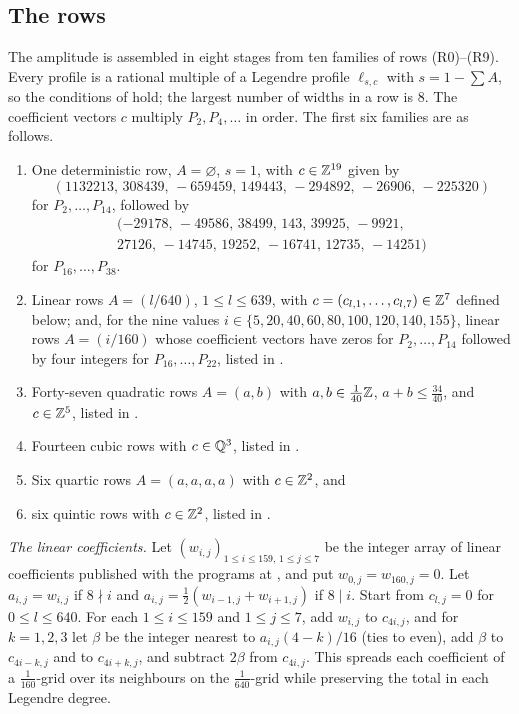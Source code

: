 \documentclass[11pt,colorlinks]{charlie}
\begin{document}
\subsection{The rows}
The amplitude is assembled in eight stages from ten families of rows (R0)--(R9). Every profile is a rational multiple of a Legendre profile $\ell_{s,c}$ with $s=1-\sum A$, so the conditions of  hold; the largest number of widths in a row is $8$. The coefficient vectors $c$ multiply $P_2,P_4,\dots$ in order. The first six families are as follows.
\begin{enumerate}
\item[(R0)] One deterministic row, $A=\varnothing$, $s=1$, with $c\in\mathbb{Z}^{19}$ given by
\[
 (1132213,\,308439,\,-659459,\,149443,\,-294892,\,-26906,\,-225320)
\]
for $P_2,\dots,P_{14}$, followed by
\begin{gather*}
 (-29178,\,-49586,\,38499,\,143,\,39925,\,-9921,\\
 27126,\,-14745,\,19252,\,-16741,\,12735,\,-14251)
\end{gather*}
for $P_{16},\dots,P_{38}$.
\item[(R1)] Linear rows $A=(l/640)$, $1\le l\le639$, with $c=(c_{l,1},\dots,c_{l,7})\in\mathbb{Z}^7$ defined below; and, for the nine values $i\in\{5,20,40,60,80,\allowbreak100,120,140,155\}$, linear rows $A=(i/160)$ whose coefficient vectors have zeros for $P_2,\dots,P_{14}$ followed by four integers for $P_{16},\dots,P_{22}$, listed in .
\item[(R2)] Forty-seven quadratic rows $A=(a,b)$ with $a,b\in\frac1{40}\mathbb{Z}$, $a+b\le\frac{34}{40}$, and $c\in\mathbb{Z}^5$, listed in .
\item[(R3)] Fourteen cubic rows with $c\in\mathbb{Q}^3$, listed in .
\item[(R4)] Six quartic rows $A=(a,a,a,a)$ with $c\in\mathbb{Z}^2$, and
\item[(R5)] six quintic rows with $c\in\mathbb{Z}^2$, listed in .
\end{enumerate}

\emph{The linear coefficients.} Let $(w_{i,j})_{1\le i\le159,\,1\le j\le7}$ be the integer array of linear coefficients published with the programs at \coderepo, and put $w_{0,j}=w_{160,j}=0$. Let $a_{i,j}=w_{i,j}$ if $8\nmid i$ and $a_{i,j}=\frac12(w_{i-1,j}+w_{i+1,j})$ if $8\mid i$. Start from $c_{l,j}=0$ for $0\le l\le640$. For each $1\le i\le159$ and $1\le j\le7$, add $w_{i,j}$ to $c_{4i,j}$, and for $k=1,2,3$ let $\beta$ be the integer nearest to $a_{i,j}(4-k)/16$ (ties to even), add $\beta$ to $c_{4i-k,j}$ and to $c_{4i+k,j}$, and subtract $2\beta$ from $c_{4i,j}$. This spreads each coefficient of a $\frac1{160}$-grid over its neighbours on the $\frac1{640}$-grid while preserving the total in each Legendre degree.
\end{document}
